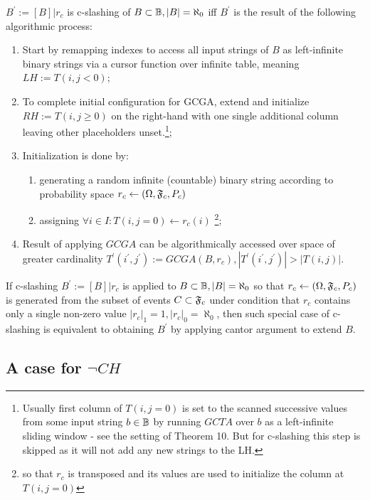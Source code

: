 \begin{definition}
  $B^\prime := [B]|r_c$ is c-slashing of $B \subset \mathbb{B}, |B| = \aleph_0$ iff $B^\prime$ is the result of the following algorithmic process:
  \begin{enumerate}
    \item Start by remapping indexes to access all input strings of $B$ as left-infinite binary strings via a cursor function over infinite table, meaning $LH := T(i,j<0)$;
    \item To complete initial configuration for GCGA, extend and initialize $RH := T(i,j \geq 0)$ on the right-hand with one single additional column leaving other placeholders unset.\footnote{Usually first column of $T(i,j=0)$ is set to the scanned successive values from some input string $b \in \mathbb{B}$ by running $GCTA$ over $b$ as a left-infinite sliding window - see the setting of Theorem 10. But for c-slashing this step is skipped as it will not add any new strings to the LH.};
    \item Initialization is done by:
      \begin{enumerate}
        \item generating a random infinite (countable) binary string according to probability space $r_c \leftarrow (\Omega,\mathfrak{F}_c,P_c)$
        \item assigning $\forall i \in I : T(i,j=0) \leftarrow r_c(i)$ \footnote{so that $r_c$ is transposed and its values are used to initialize the column at $T(i,j=0)$};
      \end{enumerate}
    \item Result of applying $GCGA$ can be algorithmically accessed over space of greater cardinality $T^\prime(i^\prime,j^\prime) := GCGA(B, r_c), |T^\prime(i^\prime,j^\prime)| > |T(i,j)|$.
  \end{enumerate}
\end{definition}

\begin{lemma}
  If c-slashing $B^\prime := [B]|r_c$ is applied to $B \subset \mathbb{B}, |B| = \aleph_0$ so that $r_c \leftarrow (\Omega,\mathfrak{F}_c,P_c)$ is generated from the subset of events $C \subset \mathfrak{F}_c$ under condition that $r_c$ contains only a single non-zero value $|r_c|_1 = 1, |r_c|_0 = \aleph_0$, then such special case of c-slashing is equivalent to obtaining $B^\prime$ by applying cantor argument to extend $B$.
\end{lemma}

\subsection{A case for $\neg CH$}

